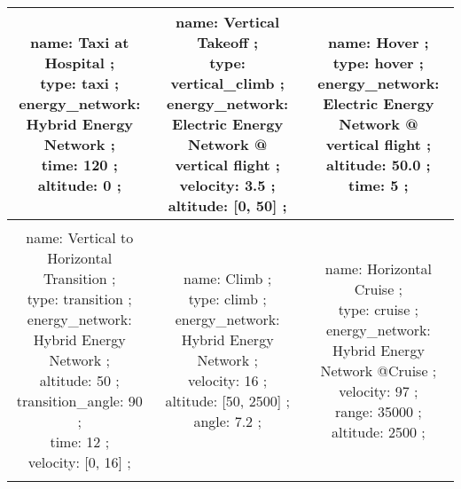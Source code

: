 \FloatBarrier 
 \begin{table}[h] 
 \begin{adjustbox}{width=1\textwidth} 
 \begin{tabular}{|c|c|c|}
 \hline 

\makecell{name: Taxi at Hospital ; \\ type: taxi ; \\ energy\_network: Hybrid Energy Network ; \\ time: 120 ; \\ altitude: 0 ; \\ } & \makecell{name: Vertical Takeoff ; \\ type: vertical\_climb ; \\ energy\_network: Electric Energy Network @ vertical flight ; \\ velocity: 3.5 ; \\ altitude: [0, 50] ; \\ } & \makecell{name: Hover ; \\ type: hover ; \\ energy\_network: Electric Energy Network @ vertical flight ; \\ altitude: 50.0 ; \\ time: 5 ; \\ }\\ \hline \\ 
\makecell{name: Vertical to Horizontal Transition ; \\ type: transition ; \\ energy\_network: Hybrid Energy Network ; \\ altitude: 50 ; \\ transition\_angle: 90 ; \\ time: 12 ; \\ velocity: [0, 16] ; \\ } & \makecell{name: Climb ; \\ type: climb ; \\ energy\_network: Hybrid Energy Network ; \\ velocity: 16 ; \\ altitude: [50, 2500] ; \\ angle: 7.2 ; \\ } & \makecell{name: Horizontal Cruise ; \\ type: cruise ; \\ energy\_network: Hybrid Energy Network @Cruise ; \\ velocity: 97 ; \\ range: 35000 ; \\ altitude: 2500 ; \\ }\\ \hline \\ 

\end{tabular}
\end{adjustbox}
\end{table}
